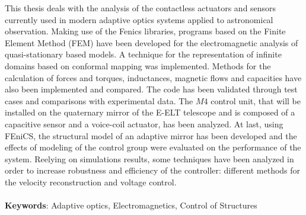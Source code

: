 This thesis deals with the analysis of the contactless actuators and sensors currently used in modern adaptive optics systems applied to astronomical observation. Making use of the Fenics libraries, programs based on the Finite Element Method (FEM) have been developed for the electromagnetic analysis of quasi-stationary based models. A technique for the representation of infinite domains based on conformal mapping was implemented.  Methods for the calculation of forces and torques, inductances, magnetic flows and capacities have also been implemented and compared. The code has been validated through test cases and comparisons with experimental data.
The $M4$ control unit, that will be installed on the quaternary mirror of the E-ELT telescope and is composed of a capacitive sensor and a voice-coil actuator, has been analyzed. At last, using FEniCS, the structural model of an adaptive mirror has been developed and the effects of modeling of the control group were evaluated on the performance of the system. Reelying on simulations results, some techniques have been analyzed in order to increase robustness and efficiency of the controller: different methods for the velocity reconstruction and voltage control.\\\\
\textbf{Keywords}: Adaptive optics, Electromagnetics, Control of Structures


\endgroup			

\vfill

